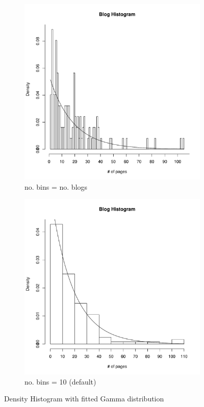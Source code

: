 \begin{figure}
\centering
\begin{subfigure}{.44\textwidth}
  \centering
  \includegraphics[width=\linewidth]{../q1/densHist.pdf}
  \caption{no. bins = no. blogs}

\end{subfigure}%
\begin{subfigure}{.44\textwidth}
  \centering
  \includegraphics[width=\linewidth]{../q1/densHist1.pdf}
  \caption{no. bins = 10 (default)}

\end{subfigure}
\caption{Density Histogram with fitted Gamma distribution}
\label{fig:test}
\end{figure}
